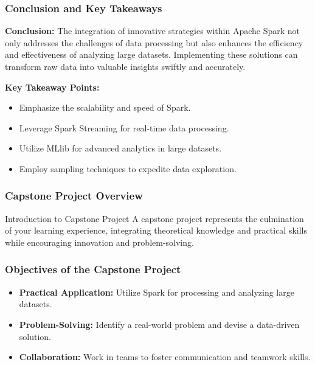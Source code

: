 \documentclass[aspectratio=169]{beamer}
\begin{document}
\begin{frame}
    \frametitle{Conclusion and Key Takeaways}
    \textbf{Conclusion:}  
    The integration of innovative strategies within Apache Spark not only addresses the challenges of data processing but also enhances the efficiency and effectiveness of analyzing large datasets. Implementing these solutions can transform raw data into valuable insights swiftly and accurately.

    \textbf{Key Takeaway Points:}
    \begin{itemize}
        \item Emphasize the scalability and speed of Spark.
        \item Leverage Spark Streaming for real-time data processing.
        \item Utilize MLlib for advanced analytics in large datasets.
        \item Employ sampling techniques to expedite data exploration.
    \end{itemize}
\end{frame}

\begin{frame}[fragile]
    \frametitle{Capstone Project Overview}
    \begin{block}{Introduction to Capstone Project}
        A capstone project represents the culmination of your learning experience, integrating theoretical knowledge and practical skills while encouraging innovation and problem-solving.
    \end{block}
\end{frame}

\begin{frame}[fragile]
    \frametitle{Objectives of the Capstone Project}
    \begin{itemize}
        \item \textbf{Practical Application:} Utilize Spark for processing and analyzing large datasets.
        \item \textbf{Problem-Solving:} Identify a real-world problem and devise a data-driven solution.
        \item \textbf{Collaboration:} Work in teams to foster communication and teamwork skills.
    \end{itemize}
\end{frame}
\end{document}
